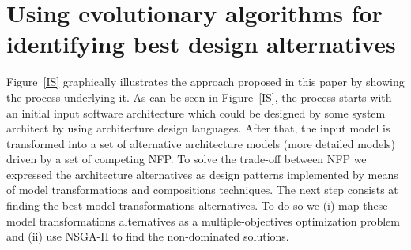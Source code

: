 \documentclass[conference]{IEEEtran}
\begin{document}
\begin{enumerate}
\end{enumerate}


\section{Using evolutionary algorithms for identifying best design alternatives}
\label{Approach}
Figure~\ref{IS} graphically illustrates the approach proposed in this paper by showing the process underlying it. As can be seen in Figure~\ref{IS}, the process starts with an initial input software architecture which could be designed by some system architect by using architecture design languages. After that, the input model is transformed into a set of alternative architecture models (more detailed models) driven by a set of competing NFP. To solve the trade-off between NFP we expressed the architecture alternatives as design patterns implemented by means of model transformations and compositions techniques. The next step consists at finding the best model transformations alternatives. To do so we (i) map these model transformations alternatives as a multiple-objectives optimization problem and (ii) use NSGA-II to find the non-dominated solutions. 

\end{document}
